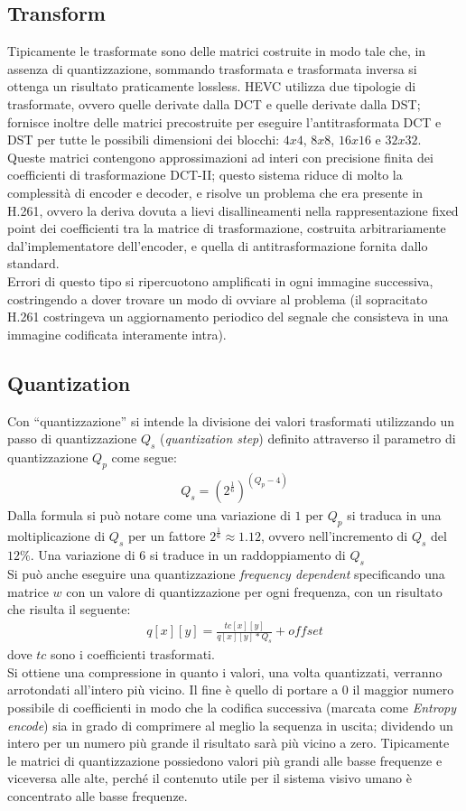 \subsection{Transform}
Tipicamente le trasformate sono delle matrici costruite in modo tale che, in 
assenza di quantizzazione, sommando trasformata e trasformata inversa si 
ottenga un risultato praticamente lossless.
HEVC utilizza due tipologie di trasformate, ovvero quelle derivate dalla DCT e
quelle derivate dalla DST; fornisce inoltre delle matrici precostruite per 
eseguire l'antitrasformata DCT e DST per tutte le possibili dimensioni dei 
blocchi: $4x4$, $8x8$, $16x16$ e $32x32$.
Queste matrici contengono approssimazioni ad interi con precisione finita dei 
coefficienti di trasformazione DCT-II; questo sistema riduce di molto la 
complessità di encoder e decoder, e risolve un problema che era presente in 
H.261, ovvero la deriva dovuta a lievi disallineamenti nella rappresentazione 
fixed point dei coefficienti tra la matrice di trasformazione, costruita 
arbitrariamente dal'implementatore dell'encoder, e quella di antitrasformazione 
fornita dallo standard. \\
Errori di questo tipo si ripercuotono amplificati in ogni immagine successiva, 
costringendo a dover trovare un modo di ovviare al problema (il sopracitato 
H.261 costringeva un aggiornamento periodico del segnale che consisteva in una 
immagine codificata interamente intra).
\subsection{Quantization}
Con ``quantizzazione'' si intende la divisione dei valori trasformati 
utilizzando un passo di quantizzazione $Q_s$ (\emph{quantization step}) definito
 attraverso il parametro di quantizzazione $Q_p$ come segue:
\begin{align*}
Q_s = \left(2^{\frac{1}{6}}\right)^{(Q_p-4)}
\end{align*}
Dalla formula si può notare come una variazione di $1$ per $Q_p$ si traduca in 
una moltiplicazione di $Q_s$ per un fattore $2^{\frac{1}{6}}\approx 1.12$, ovvero 
nell'incremento di $Q_s$ del $12\%$. Una variazione di $6$ si traduce in un 
raddoppiamento di $Q_s$ \\
Si può anche eseguire una quantizzazione \emph{frequency dependent} specificando
 una matrice $w$ con un valore di quantizzazione per ogni frequenza, con un 
risultato che risulta il seguente:
\begin{align*}
q[x][y] = \frac{tc[x][y]}{q[x][y]*Q_s}+offset
\end{align*}
dove $tc$ sono i coefficienti trasformati. \\
Si ottiene una compressione in quanto i valori, una volta quantizzati, verranno 
arrotondati all'intero più vicino. Il fine è quello di portare a 0 il maggior 
numero possibile di coefficienti in modo che la codifica successiva (marcata 
come \emph{Entropy encode}) sia in grado di comprimere al meglio la sequenza in 
uscita; dividendo un intero per un numero più grande il risultato sarà più 
vicino a zero. Tipicamente le matrici di quantizzazione possiedono valori più 
grandi alle basse frequenze e viceversa alle alte, perché il contenuto utile 
per il sistema visivo umano è concentrato alle basse frequenze.
